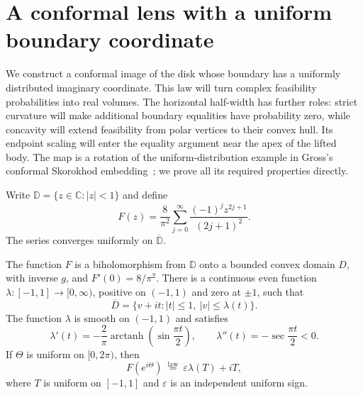 \section{A conformal lens with a uniform boundary coordinate}\label{sec:lens}

We construct a conformal image of the disk whose boundary has a uniformly
distributed imaginary coordinate. This law will turn complex feasibility
probabilities into real volumes. The horizontal half-width has further
roles: strict curvature will make additional boundary equalities have
probability zero,
while concavity will extend feasibility from polar vertices to their
convex hull. Its endpoint scaling will enter the equality argument near
the apex of the lifted body.
The map is a rotation of the uniform-distribution example in
Gross's conformal Skorokhod embedding~\cite[Section~3.2]{Gross}; we prove
all its required properties directly.

Write $\mathbb D=\{z\in\mathbb C:|z|<1\}$ and define
\begin{equation}\label{eq:lens-map}
 F(z)=\frac8{\pi^2}\sum_{j=0}^{\infty}
             \frac{(-1)^jz^{2j+1}}{(2j+1)^2}.
\end{equation}
The series converges uniformly on $\overline{\mathbb D}$.

\begin{lemma}\label{lem:planar-lens}
The function $F$ is a biholomorphism from $\mathbb D$ onto a bounded
convex domain $D$, with inverse $g$, and $F'(0)=8/\pi^2$.
There is a continuous even function $\lambda:[-1,1]\to[0,\infty)$,
positive on $(-1,1)$ and zero at $\pm1$, such that
\begin{equation}\label{eq:lens-domain}
 \overline D=\{v+it:|t|\leq1,\ |v|\leq\lambda(t)\}.
\end{equation}
The function $\lambda$ is smooth on $(-1,1)$ and satisfies
\begin{equation}\label{eq:lens-width-curvature}
 \lambda'(t)=-\frac2\pi
       \operatorname{arctanh}\!\left(\sin\frac{\pi t}{2}\right),
 \qquad
 \lambda''(t)=-\sec\frac{\pi t}{2}<0.
\end{equation}
If $\Theta$ is uniform on $[0,2\pi)$, then
\begin{equation}\label{eq:lens-boundary-law}
 F(e^{i\Theta})\ \stackrel{\mathrm{law}}{=}\
 \varepsilon\lambda(T)+iT,
\end{equation}
where $T$ is uniform on $[-1,1]$ and $\varepsilon$ is an independent
uniform sign.
\end{lemma}

